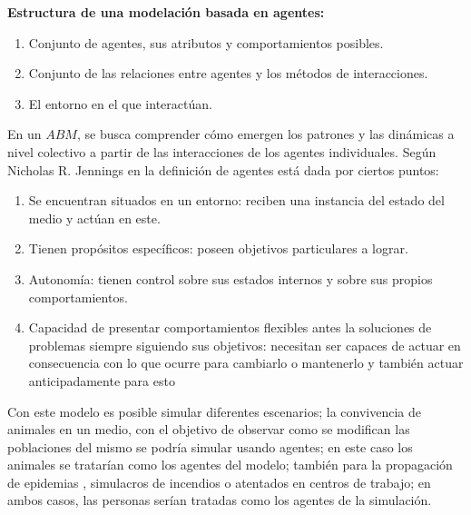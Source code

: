 \textbf{Estructura de una modelación basada en agentes:}\\
\begin{enumerate}
    \item Conjunto de agentes, sus atributos y comportamientos posibles.
    \item Conjunto de las relaciones entre agentes y los métodos de interacciones.
    \item El entorno en el que interactúan.
\end{enumerate}


En un $ABM$, se busca comprender cómo emergen los patrones y las dinámicas a nivel colectivo a partir de las interacciones 
de los agentes individuales. Según Nicholas R. Jennings en \autocite{Jennings2000} la definición de agentes está dada 
por ciertos puntos:\\
\begin{enumerate}
    \item Se encuentran situados en un entorno: reciben una instancia del estado del medio y actúan en este.
    \item Tienen propósitos específicos: poseen objetivos particulares a lograr.
    \item Autonomía: tienen control sobre sus estados internos y sobre sus propios comportamientos.
    \item Capacidad de presentar comportamientos flexibles antes la soluciones de problemas siempre siguiendo sus objetivos: necesitan ser capaces de actuar en consecuencia con lo que ocurre para cambiarlo o mantenerlo y también actuar anticipadamente para esto
\end{enumerate}

Con este modelo es posible simular diferentes escenarios; la convivencia de animales en un medio, con el 
objetivo de observar como se modifican las poblaciones del mismo se podría simular usando agentes; en este 
caso los animales se tratarían como los agentes del modelo; también para la propagación de epidemias \autocite{Bagni2002}, 
simulacros de incendios o atentados en centros de trabajo; en ambos casos, las personas serían tratadas como los agentes 
de la simulación.


